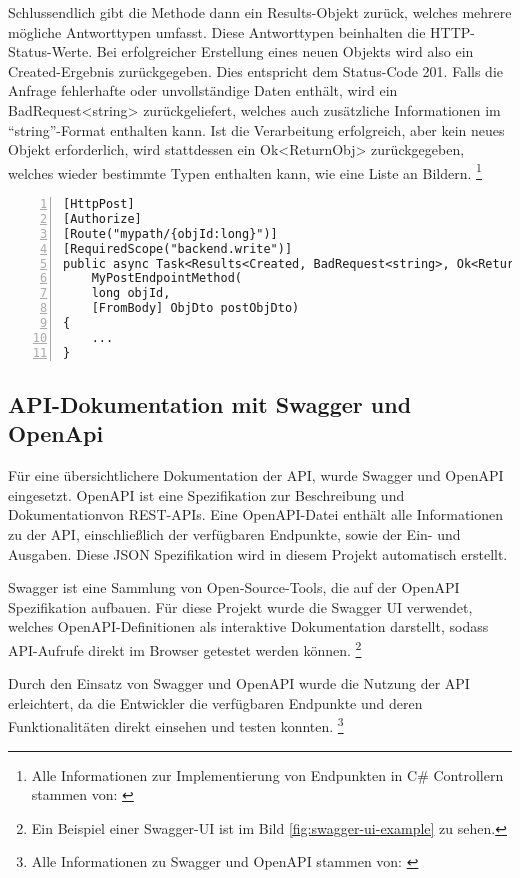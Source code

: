Schlussendlich gibt die Methode dann ein Results-Objekt zurück, welches mehrere 
mögliche Antworttypen umfasst. Diese Antworttypen beinhalten die HTTP-Status-Werte.
Bei erfolgreicher Erstellung eines neuen Objekts wird also ein Created-Ergebnis zurückgegeben. 
Dies entspricht dem Status-Code 201. Falls die Anfrage fehlerhafte oder unvollständige Daten 
enthält, wird ein BadRequest<string> zurückgeliefert, welches auch zusätzliche Informationen
im ``string''-Format enthalten kann. Ist die Verarbeitung erfolgreich, aber kein neues Objekt 
erforderlich, wird stattdessen ein Ok<ReturnObj> zurückgegeben, welches wieder bestimmte
Typen enthalten kann, wie eine Liste an Bildern.
\footnote{Alle Informationen zur Implementierung von Endpunkten in C\# Controllern stammen von: \cite{MicrosoftCorporationaa} \cite{MicrosoftCorporationab}}

\begin{lstlisting}[numbers=left,caption={Beispiel eines Endpunkts},label={lst:endpoint-example}]
[HttpPost]
[Authorize]
[Route("mypath/{objId:long}")]
[RequiredScope("backend.write")]
public async Task<Results<Created, BadRequest<string>, Ok<ReturnObj>>> 
    MyPostEndpointMethod(
    long objId, 
    [FromBody] ObjDto postObjDto)
{
    ...
}
\end{lstlisting}

\subsection{API-Dokumentation mit Swagger und OpenApi}

Für eine übersichtlichere Dokumentation der API, wurde Swagger und OpenAPI eingesetzt.
OpenAPI ist eine Spezifikation zur Beschreibung und Dokumentationvon REST-APIs. Eine
OpenAPI-Datei enthält alle Informationen zu der API, einschließlich der verfügbaren 
Endpunkte, sowie der Ein- und Ausgaben. Diese JSON Spezifikation wird in diesem Projekt
automatisch erstellt.

Swagger ist eine Sammlung von Open-Source-Tools, die auf der OpenAPI Spezifikation 
aufbauen. Für diese Projekt wurde die Swagger UI verwendet, welches OpenAPI-Definitionen 
als interaktive Dokumentation darstellt, sodass API-Aufrufe direkt im Browser getestet 
werden können.
\footnote{Ein Beispiel einer Swagger-UI ist im Bild \ref{fig:swagger-ui-example} zu sehen.}

Durch den Einsatz von Swagger und OpenAPI wurde die Nutzung der API erleichtert, 
da die Entwickler die verfügbaren Endpunkte und deren Funktionalitäten direkt 
einsehen und testen konnten. 
\footnote{Alle Informationen zu Swagger und OpenAPI stammen von: \cite{SmartBearSoftware}}

